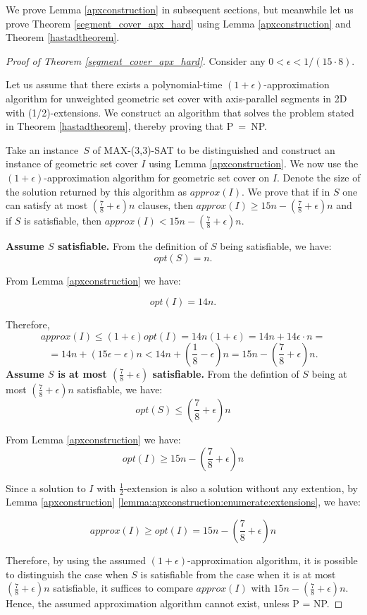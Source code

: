 We prove Lemma \ref{apxconstruction} in
subsequent sections, but meanwhile let us prove
Theorem \ref{segment_cover_apx_hard} using Lemma \ref{apxconstruction}
and Theorem \ref{hastadtheorem}.

\begin{proof}[Proof of Theorem \ref{segment_cover_apx_hard}]
Consider any $0 < \epsilon < 1/(15 \cdot 8)$.

Let us assume that there exists a polynomial-time
$(1+\epsilon)$-approximation algorithm
for unweighted geometric set cover with axis-parallel segments in 2D
with (1/2)-extensions.
We construct an algorithm that solves the problem stated in 
Theorem \ref{hastadtheorem}, thereby proving that P~=~NP.

Take an instance~$S$ of MAX-(3,3)-SAT to be distinguished
and construct an instance of geometric set cover $I$
using Lemma \ref{apxconstruction}.
We now use the $(1+\epsilon)$-approximation algorithm
for geometric set cover on $I$.
Denote the size of the solution returned by this algorithm as $approx(I)$.
We prove that 
if in $S$
one can satisfy at most $(\frac{7}{8}+\epsilon)n$ clauses,
then $approx(I) \ge 15n - (\frac{7}{8} + \epsilon)n$
and if $S$ is
satisfiable, then $approx(I) < 15n - (\frac{7}{8} + \epsilon)n$.


\textbf{Assume $S$ satisfiable.}
From the definition of $S$ being satisfiable, we have:
$$opt(S) = n.$$

From Lemma \ref{apxconstruction} we have:

$$opt(I) = 14n.$$

Therefore,
$$approx(I) \le (1+\epsilon)opt(I) = 14n(1+\epsilon)
	= 14n + 14\epsilon\cdot n =$$ 
	$$= 14n + (15\epsilon - \epsilon)n < 
  14n + \left(\frac{1}{8} - \epsilon\right)n 
= 15n - \left(\frac{7}{8} + \epsilon\right)n.$$
\textbf{Assume $S$ is at most 
$\left(\frac{7}{8} + \epsilon\right)$ satisfiable.}
From the defintion of $S$ being at most 
$\left(\frac{7}{8} + \epsilon\right)n$ satisfiable, we have:
$$opt(S) \le \left(\frac{7}{8} + \epsilon\right)n$$

From Lemma \ref{apxconstruction} we have:
$$opt(I) \ge 15n - \left(\frac{7}{8} + \epsilon\right)n$$

Since a solution to $I$ with $\frac{1}{2}$-extension is
also a solution without any extention, by 
Lemma \ref{apxconstruction} \ref{lemma:apxconstruction:enumerate:extensions}, we have:

$$approx(I) \ge opt(I) = 15n - \left(\frac{7}{8} + \epsilon\right)n$$


Therefore, by using the assumed $(1+\epsilon)$-approximation
algorithm,
it is possible to distinguish the case when
$S$ is satisfiable from the case when it is
at most $(\frac{7}{8} + \epsilon)n$ satisfiable,
it suffices to compare $approx(I)$ with $15n - (\frac{7}{8}+\epsilon)n$.
Hence, the assumed approximation algorithm cannot exist, unless P = NP.
\end{proof}

